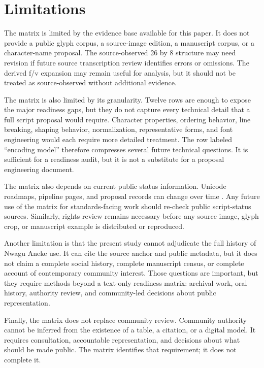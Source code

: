 \documentclass[sigconf,nonacm]{acmart}
\begin{document}
\section{Limitations}
The matrix is limited by the evidence base available for this paper. It does not
provide a public glyph corpus, a source-image edition, a manuscript corpus, or a
character-name proposal. The source-observed 26 by 8 structure may need revision
if future source transcription review identifies errors or omissions. The
derived f/v expansion may remain useful for analysis, but it should not be
treated as source-observed without additional evidence.

The matrix is also limited by its granularity. Twelve rows are enough to expose
the major readiness gaps, but they do not capture every technical detail that a
full script proposal would require. Character properties, ordering behavior,
line breaking, shaping behavior, normalization, representative forms, and font
engineering would each require more detailed treatment. The row labeled
``encoding model'' therefore compresses several future technical questions. It
is sufficient for a readiness audit, but it is not a substitute for a proposal
engineering document.

The matrix also depends on current public status information. Unicode roadmaps,
pipeline pages, and proposal records can change over time
\cite{unicodeRoadmaps,unicodePipeline2026}. Any future use of the matrix for
standards-facing work should re-check public script-status sources. Similarly,
rights review remains necessary before any source image, glyph crop, or
manuscript example is distributed or reproduced.

Another limitation is that the present study cannot adjudicate the full history
of Nwagu Aneke use. It can cite the source anchor and public metadata, but it
does not claim a complete social history, complete manuscript census, or
complete account of contemporary community interest. Those questions are
important, but they require methods beyond a text-only readiness matrix:
archival work, oral history, authority review, and community-led decisions about
public representation.

Finally, the matrix does not replace community review. Community authority
cannot be inferred from the existence of a table, a citation, or a digital
model. It requires consultation, accountable representation, and decisions about
what should be made public. The matrix identifies that requirement; it does not
complete it.
\end{document}
